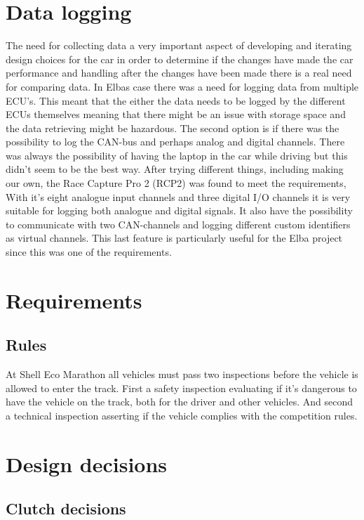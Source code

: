 \section{Data logging}
The need for collecting data a very important aspect of developing and
iterating design choices for the car in order to determine if the changes have
made the car performance and handling after the changes have been made there
is a real need for comparing data. In Elbas case there was a need for logging
data from multiple ECU's. This meant that the either the data needs to be logged
by the different ECUs themselves meaning that there might be an issue with
storage space and the data retrieving might be hazardous. The second option is
if there was the possibility to log the CAN-bus and perhaps analog and digital
channels. There was always the possibility of having the laptop in the car while
driving but this didn't seem to be the best way. After trying different things,
including making our own, the Race Capture Pro 2 (RCP2) was found to meet the
requirements, %
With it's eight analogue input channels and
three digital I/O channels it is very suitable for logging both analogue and
digital signals. It also have the possibility to communicate with two
CAN-channels and logging different custom identifiers as virtual channels. This
last feature is particularly useful for the Elba project since this was one of
the requirements.

\section{Requirements}
\subsection{Rules}
At Shell Eco Marathon all vehicles must pass two inspections before the vehicle
is allowed to enter the track. First a safety inspection evaluating if it's
dangerous to have the vehicle on the track, both for the driver and other
vehicles. And second a technical inspection asserting if the vehicle complies
with the competition rules.

\section{Design decisions}
\subsection{Clutch decisions}

